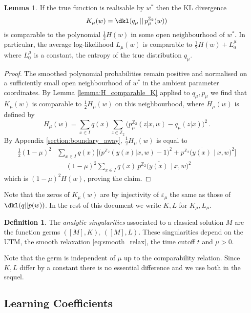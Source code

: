 \documentclass[english,letter paper,12pt,reqno]{article}
\theoremstyle{definition}
\newtheorem{lemma}[theorem]{Lemma}
\newtheorem{definition}[theorem]{Definition}
\def\be{\begin{equation}}
\def\ee{\end{equation}}
\newcommand{\bb}[1]{\mathbb{#1}}
\begin{document}
\begin{lemma}\label{lemma:comparable_H_K_L} If the true function is realisable by $w^*$ then the KL divergence
\be
K_\mu(w) = \dkl( q_\mu \, || \, p^{\bb{Z}_2}_\mu(w) )
\ee
is comparable to the polynomial $\tfrac{1}{2} H(w)$ in some open neighbourhood of $w^*$. In particular, the average log-likelihood $L_\mu(w)$ is comparable to $\tfrac{1}{2} H(w) + L^\mu_0$ where $L^\mu_0$ is a constant, the entropy of the true distribution $q_\mu$.
\end{lemma}
\begin{proof}
The smoothed polynomial probabilities remain positive and normalised on a sufficiently small open neighbourhood of $w^*$ in the ambient parameter coordinates. By Lemma \ref{lemma:H_comparable_K} applied to $q_\mu, p_\mu$ we find that $K_\mu(w)$ is comparable to $\tfrac{1}{2} H_\mu(w)$ on this neighbourhood, where $H_\mu(w)$ is defined by
\[
H_\mu(w) = \sum_{x \in I} q(x) \sum_{z \in \bb{Z}_2} \Big( p^{\bb{Z}_2}_\mu( z | x, w) - q_\mu(z|x) \Big)^2\,.
\]
By Appendix \ref{section:boundary_away}, $\tfrac{1}{2}H_\mu(w)$ is equal to
\begin{align*}
\tfrac{1}{2} (1-\mu)^2 &\sum_{x \in I} q(x)\Big[ \Big( p^{\bb{Z}_2}( y(x) | x, w) - 1 \Big)^2 + p^{\bb{Z}_2}\big( \overline{y(x)} \mid x, w\big)^2 \Big]\\
&= (1-\mu)^2 \sum_{x \in I} q(x) \, p^{\bb{Z}_2}\big( \overline{y(x)} \mid x, w\big)^2
\end{align*}
which is $(1-\mu)^2 H(w)$, proving the claim.
\end{proof}

Note that the zeros of $K_\mu(w)$ are by injectivity of $\varepsilon_\mu$ the same as those of $\dkl( q || p(w) )$. In the rest of this document we write $K, L$ for $K_\mu, L_\mu$.

\begin{definition} The \emph{analytic singularities} associated to a classical solution $M$ are the function germs $([M], K)$, $([M], L)$. These singularities depend on the UTM, the smooth relaxation \eqref{eq:smooth_relax}, the time cutoff $t$ and $\mu > 0$.
\end{definition}

Note that the germ is independent of $\mu$ up to the comparability relation. Since $K, L$ differ by a constant there is no essential difference and we use both in the sequel.

\subsection{Learning Coefficients}\label{section:background_llc}
\end{document}
